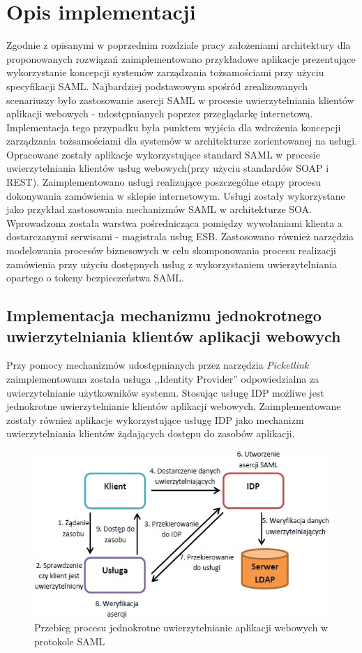 \chapter{Opis implementacji}
\label{cha:implementacja}

Zgodnie z opisanymi w poprzednim rozdziale pracy założeniami architektury dla proponowanych rozwiązań zaimplementowano przykładowe aplikacje prezentujące wykorzystanie koncepcji systemów zarządzania tożsamościami przy użyciu specyfikacji SAML. Najbardziej podstawowym spośród zrealizowanych scenariuszy było zastosowanie asercji SAML w procesie uwierzytelniania klientów aplikacji webowych - udostępnianych poprzez przeglądarkę internetową. Implementacja tego przypadku była punktem wyjścia dla wdrożenia koncepcji zarządzania tożsamościami dla systemów w architekturze zorientowanej na usługi. Opracowane zostały aplikacje wykorzystujące standard SAML w procesie uwierzytelniania klientów usług webowych(przy użyciu standardów SOAP i REST). Zaimplementowano usługi realizujące poszczególne etapy procesu dokonywania zamówienia w sklepie internetowym. Usługi zostały wykorzystane jako przykład zastosowania mechanizmów SAML w architekturze SOA. Wprowadzona została warstwa pośrednicząca pomiędzy wywołaniami klienta a dostarczanymi serwisami - magistrala usług ESB. Zastosowano również narzędzia modelowania procesów biznesowych w celu skomponowania procesu realizacji zamówienia przy użyciu dostępnych usług z wykorzystaniem uwierzytelniania opartego o tokeny bezpieczeństwa SAML. 

\section{Implementacja mechanizmu jednokrotnego uwierzytelniania klientów aplikacji webowych}

	Przy pomocy mechanizmów udostępnianych przez narzędzia \textit{Picketlink} zaimplementowana została usługa ,,Identity Provider'' odpowiedzialna za uwierzytelnianie użytkowników systemu. Stosując usługę IDP możliwe jest jednokrotne uwierzytelnianie klientów aplikacji webowych. Zaimplementowane zostały również aplikacje wykorzystujące usługę IDP jako mechanizm uwierzytelniania klientów żądających dostępu do zasobów aplikacji.

	\begin{figure}[h]
		\centering
		\includegraphics{img/samlWebSSO.jpg}
		\caption{Przebieg procesu jednokrotne uwierzytelnianie aplikacji webowych w protokole SAML}
		\label{samlSSOSteps}
	\end{figure}
		
